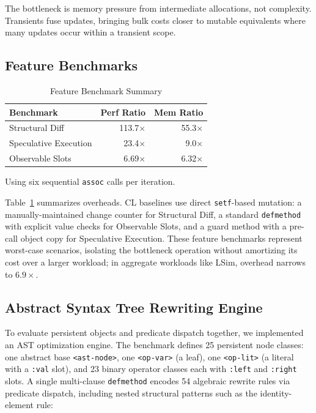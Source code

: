 \documentclass[sigconf,nonacm]{acmart}
\begin{document}
The bottleneck is memory pressure from intermediate allocations, not complexity. Transients fuse updates, bringing bulk costs closer to mutable equivalents where many updates occur within a transient scope.

\subsection{Feature Benchmarks}
\label{sec:feature-bench}
\begin{table}[htbp]
\small
\caption{Feature Benchmark Summary}
\label{tab:feature-bench}
\begin{threeparttable}
\begin{tabular}{lrr}
\toprule
\textbf{Benchmark} & \textbf{Perf Ratio} & \textbf{Mem Ratio} \\
\midrule
Structural Diff\tnote{a} & 113.7$\times$ & 55.3$\times$ \\
Speculative Execution & 23.4$\times$ & 9.0$\times$ \\
Observable Slots & 6.69$\times$ & 6.32$\times$ \\
\bottomrule
\end{tabular}
\begin{tablenotes}
  \footnotesize
  \item[a] Using six sequential \texttt{assoc} calls per iteration. 
\end{tablenotes}
\end{threeparttable}
\end{table}

Table~\ref{tab:feature-bench} summarizes overheads. CL baselines use direct \texttt{setf}-based mutation: a manually-maintained change counter for Structural Diff, a standard \texttt{defmethod} with explicit value checks for Observable Slots, and a guard method with a pre-call object copy for Speculative Execution. These feature benchmarks represent worst-case scenarios, isolating the bottleneck operation without amortizing its cost over a larger workload; in aggregate workloads like LSim, overhead narrows to $6.9\times$.



\subsection{Abstract Syntax Tree Rewriting Engine}
\label{sec:ast-bench}

To evaluate persistent objects and predicate dispatch together, we implemented an AST optimization engine. The benchmark defines 25 persistent node classes: one abstract base \texttt{<ast-node>}, one \texttt{<op-var>} (a leaf), one \texttt{<op-lit>} (a literal with a \texttt{:val} slot), and 23 binary operator classes each with \texttt{:left} and \texttt{:right} slots. A single multi-clause \texttt{defmethod} encodes 54 algebraic rewrite rules via predicate dispatch, including nested structural patterns such as the identity-element rule:
\end{document}
